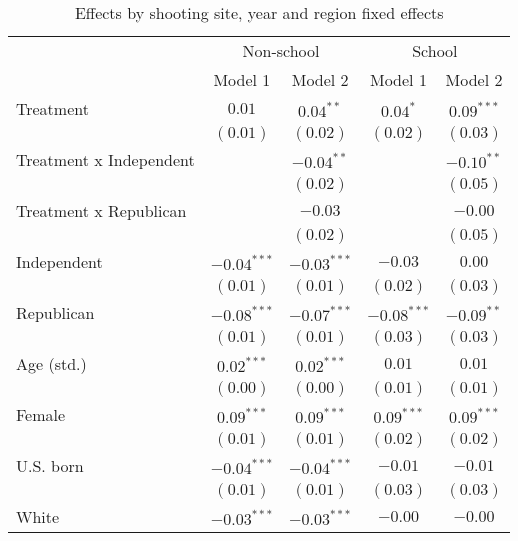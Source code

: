 
\begin{table}
\caption{Effects by shooting site, year and region fixed effects}
\begin{center}
\begin{tabular}{l c c c c}
\toprule
 & \multicolumn{2}{c}{Non-school} & \multicolumn{2}{c}{School} \\
\cmidrule(lr){2-3} \cmidrule(lr){4-5}
 & Model 1 & Model 2 & Model 1 & Model 2 \\
\midrule
Treatment               & $0.01$        & $0.04^{**}$   & $0.04^{*}$    & $0.09^{***}$  \\
                        & $(0.01)$      & $(0.02)$      & $(0.02)$      & $(0.03)$      \\
Treatment x Independent &               & $-0.04^{**}$  &               & $-0.10^{**}$  \\
                        &               & $(0.02)$      &               & $(0.05)$      \\
Treatment x Republican  &               & $-0.03$       &               & $-0.00$       \\
                        &               & $(0.02)$      &               & $(0.05)$      \\
Independent             & $-0.04^{***}$ & $-0.03^{***}$ & $-0.03$       & $0.00$        \\
                        & $(0.01)$      & $(0.01)$      & $(0.02)$      & $(0.03)$      \\
Republican              & $-0.08^{***}$ & $-0.07^{***}$ & $-0.08^{***}$ & $-0.09^{**}$  \\
                        & $(0.01)$      & $(0.01)$      & $(0.03)$      & $(0.03)$      \\
Age (std.)              & $0.02^{***}$  & $0.02^{***}$  & $0.01$        & $0.01$        \\
                        & $(0.00)$      & $(0.00)$      & $(0.01)$      & $(0.01)$      \\
Female                  & $0.09^{***}$  & $0.09^{***}$  & $0.09^{***}$  & $0.09^{***}$  \\
                        & $(0.01)$      & $(0.01)$      & $(0.02)$      & $(0.02)$      \\
U.S. born               & $-0.04^{***}$ & $-0.04^{***}$ & $-0.01$       & $-0.01$       \\
                        & $(0.01)$      & $(0.01)$      & $(0.03)$      & $(0.03)$      \\
White                   & $-0.03^{***}$ & $-0.03^{***}$ & $-0.00$       & $-0.00$       \\

\end{tabular}
\end{center}
\end{table}
